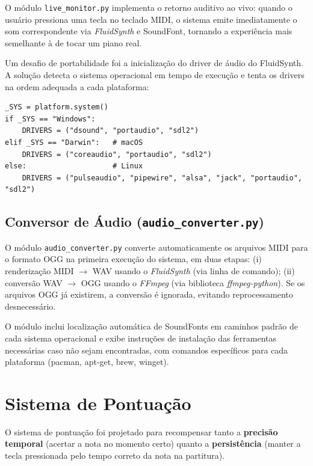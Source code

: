 \documentclass[
  12pt,
  openright,
  twoside,
  a4paper,
  english,
  brazil
]{abntex2}
\begin{document}
O módulo \texttt{live\_monitor.py} implementa o retorno auditivo ao
vivo: quando o usuário pressiona uma tecla no teclado MIDI, o sistema
emite imediatamente o som correspondente via \textit{FluidSynth} e
SoundFont, tornando a experiência mais semelhante à de tocar um piano
real.

Um desafio de portabilidade foi a inicialização do driver de áudio do
FluidSynth. A solução detecta o sistema operacional em tempo de execução
e tenta os drivers na ordem adequada a cada plataforma:

\begin{lstlisting}[caption={Seleção de driver de áudio por plataforma.},
                   label={lst:drivers}]
_SYS = platform.system()
if _SYS == "Windows":
    DRIVERS = ("dsound", "portaudio", "sdl2")
elif _SYS == "Darwin":   # macOS
    DRIVERS = ("coreaudio", "portaudio", "sdl2")
else:                    # Linux
    DRIVERS = ("pulseaudio", "pipewire", "alsa", "jack", "portaudio", "sdl2")
\end{lstlisting}

\subsection{Conversor de Áudio (\texttt{audio\_converter.py})}

O módulo \texttt{audio\_converter.py} converte automaticamente os
arquivos MIDI para o formato OGG na primeira execução do sistema, em
duas etapas: (i) renderização MIDI $\to$ WAV usando o \textit{FluidSynth}
(via linha de comando); (ii) conversão WAV $\to$ OGG usando o
\textit{FFmpeg} (via biblioteca \textit{ffmpeg-python}). Se os arquivos
OGG já existirem, a conversão é ignorada, evitando reprocessamento
desnecessário.

O módulo inclui localização automática de SoundFonts em caminhos padrão
de cada sistema operacional e exibe instruções de instalação das
ferramentas necessárias caso não sejam encontradas, com comandos
específicos para cada plataforma (pacman, apt-get, brew, winget).

\section{Sistema de Pontuação}
\label{sec:pontuacao}

O sistema de pontuação foi projetado para recompensar tanto a
\textbf{precisão temporal} (acertar a nota no momento certo) quanto a
\textbf{persistência} (manter a tecla pressionada pelo tempo correto da
nota na partitura).
\end{document}
